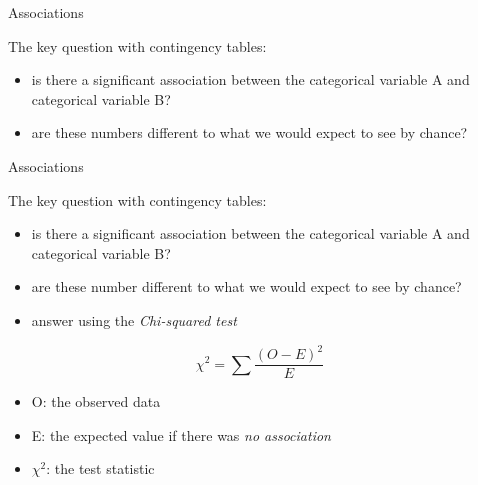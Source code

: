 \documentclass[
  ignorenonframetext,
  t]{beamer}
\providecommand{\tightlist}{%
  \setlength{\itemsep}{0pt}\setlength{\parskip}{0pt}}
\begin{document}
\begin{frame}{Associations}
\protect\hypertarget{associations-3}{}

The key question with contingency tables:

\begin{itemize}
\tightlist
\item
  is there a significant association between the categorical variable A
  and categorical variable B?
\item
  are these numbers different to what we would expect to see by chance?
\end{itemize}

\end{frame}

\begin{frame}{Associations}
\protect\hypertarget{associations-4}{}

The key question with contingency tables:

\begin{itemize}
\tightlist
\item
  is there a significant association between the categorical variable A
  and categorical variable B?
\item
  are these number different to what we would expect to see by chance?
\item
  answer using the \emph{Chi-squared test}
\end{itemize}

\[ \chi^2 = \sum \frac{(O-E)^2}{E}\]

\begin{itemize}
\tightlist
\item
  O: the observed data
\item
  E: the expected value if there was \emph{no association}
\item
  \(\chi^2\): the test statistic
\end{itemize}

\end{frame}
\end{document}
